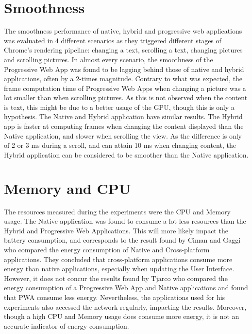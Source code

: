 \documentclass{kththesis}
\begin{document}
\section{Smoothness}
The smoothness performance of native, hybrid and progressive web applications was evaluated in 4 different scenarios as they triggered different stages of Chrome's rendering pipeline: changing a text, scrolling a text, changing pictures and scrolling pictures. In almost every scenario, the smoothness of the Progressive Web App was found to be lagging behind those of native and hybrid applications, often by a 2-times magnitude.\newline
Contrary to what was expected, the frame computation time of Progressive Web Apps when changing a picture was a lot smaller than when scrolling pictures. As this is not observed when the content is text, this might be due to a better usage of the GPU, though this is only a hypothesis. \newline
The Native and Hybrid application have similar results. The Hybrid app is faster at computing frames when changing the content displayed than the Native application, and slower when scrolling the view. As the difference is only of 2 or 3 ms during a scroll, and can attain 10 ms when changing content, the Hybrid application can be considered to be smoother than the Native application.


\section{Memory and CPU}
The resources measured during the experiments were the CPU and Memory usage. The Native application was found to consume a lot less resources than the Hybrid and Progressive Web Applications. This will more likely impact the battery consumption, and corresponds to the result found by Ciman and Gaggi \cite{ciman2017empirical} who compared the energy consumption of Native and Cross-platform applications. They concluded that cross-platform applications consume more energy than native applications, especially when updating the User Interface. However, it does not concur the results found by Tjarco \cite{PWAapplicability} who compared the energy consumption of a Progressive Web App and Native applications and found that PWA consume less energy. Nevertheless, the applications used for his experiments also accessed the network regularly, impacting the results. Moreover, though a high CPU and Memory usage does consume more energy, it is not an accurate indicator of energy consumption.
\end{document}
